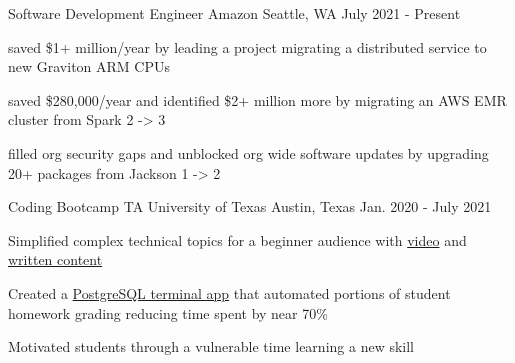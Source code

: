 

\begin{cventries}

  \cventry
    {Software Development Engineer} %
    {Amazon} %
    {Seattle, WA} %
    {July 2021 - Present} %
    {
      \begin{cvitems} %
        \item {saved \$1+ million/year by leading a project migrating a distributed service to new Graviton ARM CPUs}
        \item {saved \$280,000/year and identified \$2+ million more by migrating an AWS EMR cluster from Spark 2 -> 3}
        \item {filled org security gaps and unblocked org wide software updates by upgrading 20+ packages from Jackson 1 -> 2}
      \end{cvitems}
    }

  \cventry
    {Coding Bootcamp TA} %
    {University of Texas} %
    {Austin, Texas} %
    {Jan. 2020 - July 2021} %
    {
      \begin{cvitems} %
        \item {Simplified complex technical topics for a beginner audience with \href{https://youtu.be/G4tDjGUD-T4}{video} and \href{https://www.linkedin.com/pulse/how-deal-knowledge-work-frustration-geoff-langenderfer/?trackingId=Z6YGiHpVRFi4PCNxybaPfw\%3D\%3D}{written content}}
        \item {Created a \href{https://youtu.be/ELCZ5dAS6Zg}{PostgreSQL terminal app} that automated portions of student homework grading reducing time spent by near 70\%}
        \item {Motivated students through a vulnerable time learning a new skill}
      \end{cvitems}
    }

\end{cventries}

